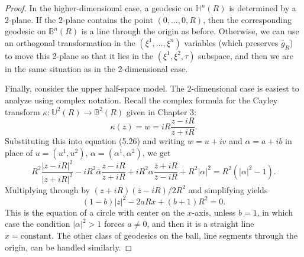 \begin{theorem}
\begin{proof}

In the higher-dimensional case, a geodesic on $\mathbb{H}^n(R)$ is determined by a 2-plane. If the 2-plane contains the point $(0,\ldots,0,R)$, then the corresponding geodesic on $\mathbb{B}^n(R)$ is a line through the origin as before. Otherwise, we can use an orthogonal transformation in the $(\xi^1,\ldots,\xi^n)$ variables (which preserves $\overline{g}_R$) to move this 2-plane so that it lies in the $(\xi^1,\xi^2,\tau)$ subspace, and then we are in the same situation as in the 2-dimensional case.

Finally, consider the upper half-space model. The 2-dimensional case is easiest to analyze using complex notation. Recall the complex formula for the Cayley transform $\kappa : \mathbb{U}^2(R) \to \mathbb{B}^2(R)$ given in Chapter 3:
\[
\kappa(z) = w = iR\frac{z-iR}{z+iR}.
\]
Substituting this into equation (5.26) and writing $w = u + iv$ and $\alpha = a + ib$ in place of $u = (u^1,u^2)$, $\alpha = (\alpha^1,\alpha^2)$, we get
\[
R^2\frac{|z-iR|^2}{|z+iR|^2} - iR^2\bar{\alpha}\frac{z-iR}{z+iR} + iR^2\alpha\frac{\bar{z}+iR}{\bar{z}-iR} + R^2|\alpha|^2 = R^2(|\alpha|^2 - 1).
\]
Multiplying through by $(z+iR)(\bar{z}-iR)/2R^2$ and simplifying yields
\[
(1-b)|z|^2 - 2aRx + (b+1)R^2 = 0.
\]
This is the equation of a circle with center on the $x$-axis, unless $b = 1$, in which case the condition $|\alpha|^2 > 1$ forces $a \neq 0$, and then it is a straight line $x = \text{constant}$. The other class of geodesics on the ball, line segments through the origin, can be handled similarly.


\end{proof}
\end{theorem}
